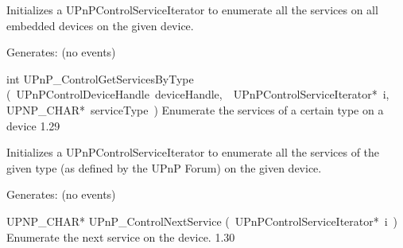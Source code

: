 \documentclass{article}
\begin{document}
\begin{cxxentry}
\begin{cxxfunction}
\begin{cxxdoc}
Initializes a UPnPControlServiceIterator to enumerate all the
services on all embedded devices on the given device.

Generates:
(no events)


\end{cxxdoc}
\end{cxxfunction}
\begin{cxxfunction}
{int}
        {UPnP\_ControlGetServicesByType}
        {(\ UPnPControlDeviceHandle\ deviceHandle,\ \ UPnPControlServiceIterator*\ i,\ \ UPNP\_CHAR*\ serviceType\ )}
        {Enumerate the services of a certain type on a device }
        {1.29}
\begin{cxxdoc}

Initializes a UPnPControlServiceIterator to enumerate all the
services of the given type (as defined by the UPnP Forum) on the given
device.

Generates:
(no events)


\end{cxxdoc}
\end{cxxfunction}
\begin{cxxfunction}
{UPNP\_CHAR*}
        {UPnP\_ControlNextService}
        {(\ UPnPControlServiceIterator*\ i\ )}
        {Enumerate the next service on the device. }
        {1.30}
\begin{cxxdoc}


\end{cxxdoc}
\end{cxxfunction}
\end{cxxentry}
\end{document}
